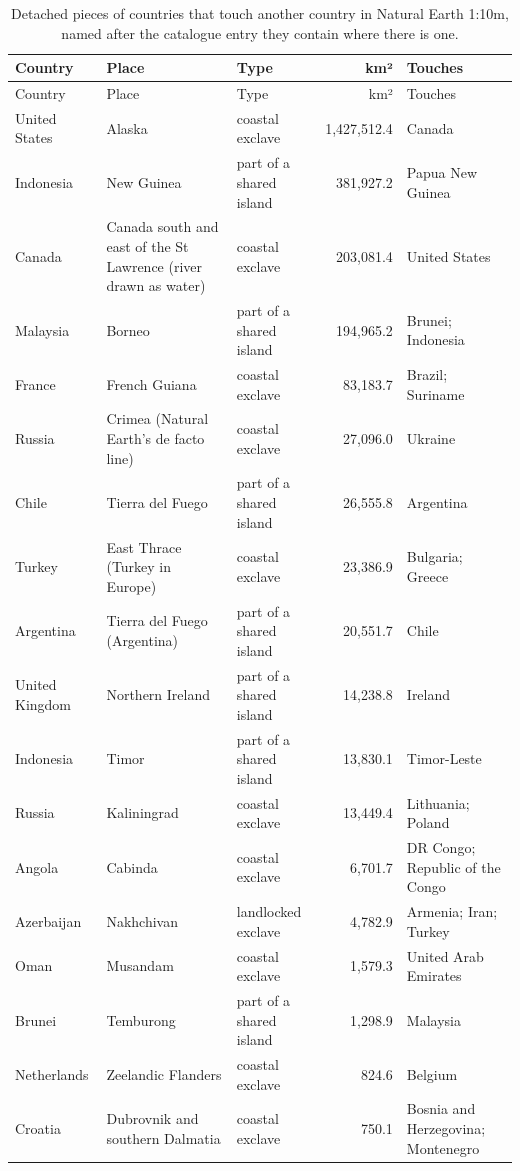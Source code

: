 \documentclass[11pt,a4paper]{article}
\begin{document}
{\footnotesize\begin{longtable}{p{2.6cm}p{4.4cm}p{2.6cm}rp{3.4cm}}\caption{Detached pieces of countries that touch another country in Natural Earth 1:10m, named after the catalogue entry they contain where there is one.}\label{tab:ne}\\\toprule Country & Place & Type & km² & Touches\\\midrule\endfirsthead
\toprule Country & Place & Type & km² & Touches\\\midrule\endhead
United States & Alaska & coastal exclave & 1,427,512.4 & Canada\\
Indonesia & New Guinea & part of a shared island & 381,927.2 & Papua New Guinea\\
Canada & Canada south and east of the St Lawrence (river drawn as water) & coastal exclave & 203,081.4 & United States\\
Malaysia & Borneo & part of a shared island & 194,965.2 & Brunei; Indonesia\\
France & French Guiana & coastal exclave & 83,183.7 & Brazil; Suriname\\
Russia & Crimea (Natural Earth's de facto line) & coastal exclave & 27,096.0 & Ukraine\\
Chile & Tierra del Fuego & part of a shared island & 26,555.8 & Argentina\\
Turkey & East Thrace (Turkey in Europe) & coastal exclave & 23,386.9 & Bulgaria; Greece\\
Argentina & Tierra del Fuego (Argentina) & part of a shared island & 20,551.7 & Chile\\
United Kingdom & Northern Ireland & part of a shared island & 14,238.8 & Ireland\\
Indonesia & Timor & part of a shared island & 13,830.1 & Timor-Leste\\
Russia & Kaliningrad & coastal exclave & 13,449.4 & Lithuania; Poland\\
Angola & Cabinda & coastal exclave & 6,701.7 & DR Congo; Republic of the Congo\\
Azerbaijan & Nakhchivan & landlocked exclave & 4,782.9 & Armenia; Iran; Turkey\\
Oman & Musandam & coastal exclave & 1,579.3 & United Arab Emirates\\
Brunei & Temburong & part of a shared island & 1,298.9 & Malaysia\\
Netherlands & Zeelandic Flanders & coastal exclave & 824.6 & Belgium\\
Croatia & Dubrovnik and southern Dalmatia & coastal exclave & 750.1 & Bosnia and Herzegovina; Montenegro\\

\end{longtable}}
\end{document}
